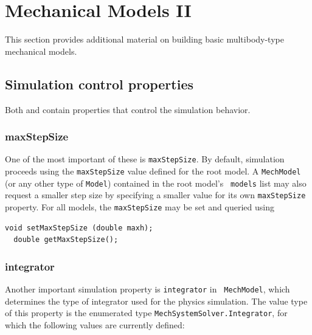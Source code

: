 \ifdefined\maindoc\else
\def\doctitle{Mechanical Models II}

\mainmatter
\fi

\chapter{Mechanical Models II}
\label{MechModelsII:sec}

This section provides additional material on building basic
multibody-type mechanical models.

\section{Simulation control properties}

Both  and
 contain properties
that control the simulation behavior. 

\subsection{maxStepSize}

One of the most important of
these is {\tt maxStepSize}. By default, simulation proceeds using the
{\tt maxStepSize} value defined for the root model. A {\tt MechModel}
(or any other type of {\tt Model}) contained in the root model's {\tt
models} list may also request a smaller step size by specifying a
smaller value for its own {\tt maxStepSize} property.  For all models,
the {\tt maxStepSize} may be set and queried using
%
\begin{lstlisting}[]
  void setMaxStepSize (double maxh);
  double getMaxStepSize();
\end{lstlisting}
%

\subsection{integrator}

Another important simulation property is {\tt integrator} in {\tt
MechModel}, which determines the type of integrator used for the
physics simulation. The value type of this property is the enumerated
type {\tt MechSystemSolver.Integrator}, for which the following values
are currently defined:

